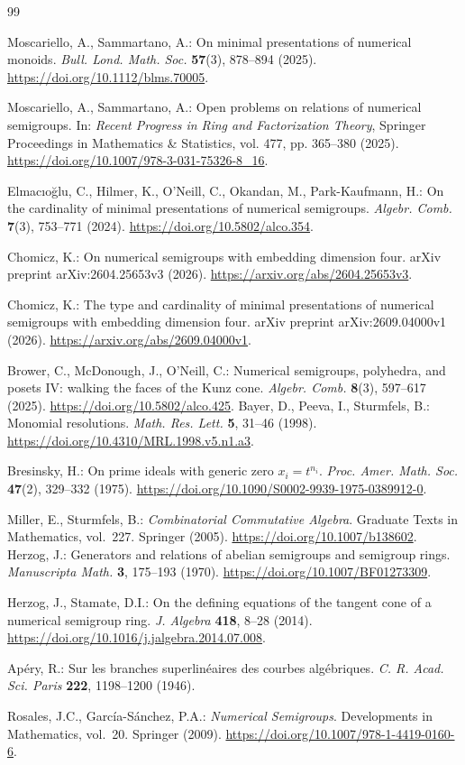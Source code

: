 \documentclass[11pt]{article}
\theoremstyle{definition}
\theoremstyle{remark}
\theoremstyle{plain}
\begin{document}
\begin{thebibliography}{99}

 Moscariello, A., Sammartano, A.: On minimal presentations of numerical monoids. \emph{Bull. Lond. Math. Soc.} \textbf{57}(3), 878--894 (2025). \url{https://doi.org/10.1112/blms.70005}.

 Moscariello, A., Sammartano, A.: Open problems on relations of numerical semigroups. In: \emph{Recent Progress in Ring and Factorization Theory}, Springer Proceedings in Mathematics \& Statistics, vol. 477, pp. 365--380 (2025). \url{https://doi.org/10.1007/978-3-031-75326-8_16}.

 Elmac\i{}o\u{g}lu, C., Hilmer, K., O'Neill, C., Okandan, M., Park-Kaufmann, H.: On the cardinality of minimal presentations of numerical semigroups. \emph{Algebr. Comb.} \textbf{7}(3), 753--771 (2024). \url{https://doi.org/10.5802/alco.354}.

 Chomicz, K.: On numerical semigroups with embedding dimension four. arXiv preprint arXiv:2604.25653v3 (2026). \url{https://arxiv.org/abs/2604.25653v3}.

 Chomicz, K.: The type and cardinality of minimal presentations of numerical semigroups with embedding dimension four. arXiv preprint arXiv:2609.04000v1 (2026). \url{https://arxiv.org/abs/2609.04000v1}.

 Brower, C., McDonough, J., O'Neill, C.: Numerical semigroups, polyhedra, and posets IV: walking the faces of the Kunz cone. \emph{Algebr. Comb.} \textbf{8}(3), 597--617 (2025). \url{https://doi.org/10.5802/alco.425}.
Bayer, D., Peeva, I., Sturmfels, B.:
Monomial resolutions. \emph{Math. Res. Lett.} \textbf{5},
31--46 (1998).
\url{https://doi.org/10.4310/MRL.1998.v5.n1.a3}.

Bresinsky, H.: On prime ideals with generic zero $x_i=t^{n_i}$.
\emph{Proc. Amer. Math. Soc.} \textbf{47}(2), 329--332 (1975).
\url{https://doi.org/10.1090/S0002-9939-1975-0389912-0}.

Miller, E., Sturmfels, B.: \emph{Combinatorial Commutative Algebra}.
Graduate Texts in Mathematics, vol.~227. Springer (2005).
\url{https://doi.org/10.1007/b138602}.
Herzog, J.: Generators and relations of abelian semigroups and semigroup rings.
\emph{Manuscripta Math.} \textbf{3}, 175--193 (1970).
\url{https://doi.org/10.1007/BF01273309}.

Herzog, J., Stamate, D.I.: On the defining equations of the tangent cone of
a numerical semigroup ring. \emph{J. Algebra} \textbf{418}, 8--28 (2014).
\url{https://doi.org/10.1016/j.jalgebra.2014.07.008}.

Ap\'ery, R.: Sur les branches superlin\'eaires des courbes alg\'ebriques.
\emph{C. R. Acad. Sci. Paris} \textbf{222}, 1198--1200 (1946).

Rosales, J.C., Garc\'ia-S\'anchez, P.A.: \emph{Numerical Semigroups}.
Developments in Mathematics, vol.~20. Springer (2009).
\url{https://doi.org/10.1007/978-1-4419-0160-6}.
\end{thebibliography}
\end{document}
